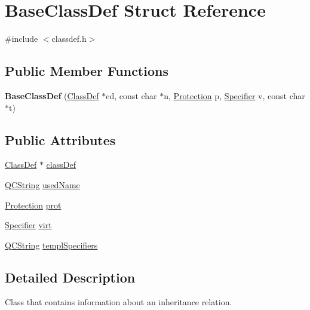 \hypertarget{struct_base_class_def}{}\section{Base\+Class\+Def Struct Reference}
\label{struct_base_class_def}


{\ttfamily \#include $<$classdef.\+h$>$}

\subsection*{Public Member Functions}
\begin{DoxyCompactItemize}
\item 
\mbox{\label{struct_base_class_def_aa80f7dccec0c358dc35378e4d211f1b2}} 
{\bfseries Base\+Class\+Def} (\mbox{\hyperlink{class_class_def}{Class\+Def}} $\ast$cd, const char $\ast$n, \mbox{\hyperlink{types_8h_a90e352184df58cd09455fe9996cd4ded}{Protection}} p, \mbox{\hyperlink{types_8h_ab16236bdd10ddf4d73a9847350f0017e}{Specifier}} v, const char $\ast$t)
\end{DoxyCompactItemize}
\subsection*{Public Attributes}
\begin{DoxyCompactItemize}
\item 
\mbox{\hyperlink{class_class_def}{Class\+Def}} $\ast$ \mbox{\hyperlink{struct_base_class_def_a2a62f0f7057f4cd514f3d1417191ff26}{class\+Def}}
\item 
\mbox{\hyperlink{class_q_c_string}{Q\+C\+String}} \mbox{\hyperlink{struct_base_class_def_ae7703a5a743ee3b6c066d8037fc71f4e}{used\+Name}}
\item 
\mbox{\hyperlink{types_8h_a90e352184df58cd09455fe9996cd4ded}{Protection}} \mbox{\hyperlink{struct_base_class_def_ab5a986f56300bfa53f7c4cff58196294}{prot}}
\item 
\mbox{\hyperlink{types_8h_ab16236bdd10ddf4d73a9847350f0017e}{Specifier}} \mbox{\hyperlink{struct_base_class_def_a844100c6fcd90233e01e52fc92107464}{virt}}
\item 
\mbox{\hyperlink{class_q_c_string}{Q\+C\+String}} \mbox{\hyperlink{struct_base_class_def_a2b8a712d468d70c6c80b5c07f49711ae}{templ\+Specifiers}}
\end{DoxyCompactItemize}


\subsection{Detailed Description}
Class that contains information about an inheritance relation. 

